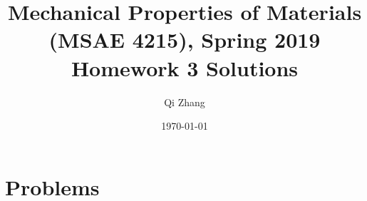 \documentclass[12pt]{article}
\begin{document}

\title{Mechanical Properties of Materials (MSAE 4215), Spring 2019\\ Homework 3 Solutions}
\author{Qi Zhang}
\date{\today}

\maketitle

\tableofcontents
\listoffigures
\listoftables

\section{Problems}
\end{document}
